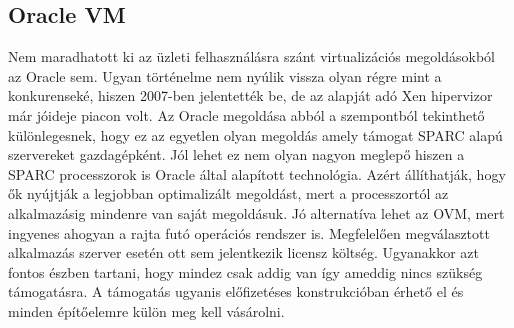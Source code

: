 \documentclass[12pt,oneside,justify,table]{book}
\begin{document}
\subsection{Oracle\textsuperscript{\textregistered} VM}
Nem maradhatott ki az üzleti felhasználásra szánt virtualizációs megoldásokból az Oracle sem. Ugyan történelme nem nyúlik vissza olyan régre mint a konkurenseké, hiszen 2007-ben jelentették be, de az alapját adó Xen hipervizor már jóideje piacon volt. Az Oracle megoldása abból a szempontból tekinthető különlegesnek, hogy ez az egyetlen olyan megoldás amely támogat SPARC alapú szervereket gazdagépként. Jól lehet ez nem olyan nagyon meglepő hiszen a SPARC processzorok is Oracle által alapított technológia. Azért állíthatják, hogy ők nyújtják a legjobban optimalizált megoldást, mert a processzortól az alkalmazásig mindenre van saját megoldásuk. Jó alternatíva lehet az OVM, mert ingyenes ahogyan a rajta futó operációs rendszer is. Megfelelően megválasztott alkalmazás szerver esetén ott sem jelentkezik licensz költség. Ugyanakkor azt fontos észben tartani, hogy mindez csak addig van így ameddig nincs szükség támogatásra. A támogatás ugyanis előfizetéses konstrukcióban érhető el és minden építőelemre külön meg kell vásárolni. 
\end{document}
